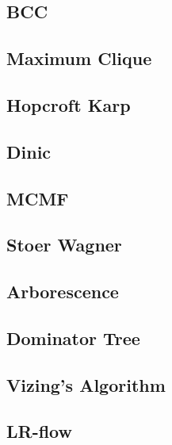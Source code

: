 \documentclass[10pt,landscape,a4paper,twocolumn]{article}
\begin{document}
\subsection{BCC}


\subsection{Maximum Clique}


\subsection{Hopcroft Karp}


\subsection{Dinic}


\subsection{MCMF}


\subsection{Stoer Wagner}


\subsection{Arborescence}


\subsection{Dominator Tree}


\subsection{Vizing's Algorithm}


\subsection{LR-flow}

\end{document}
